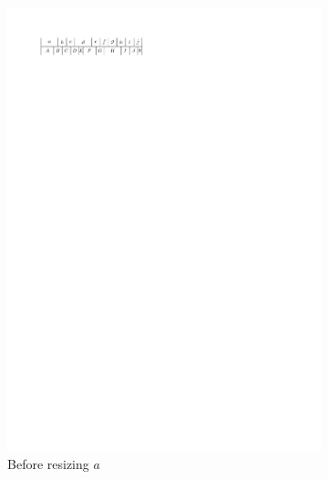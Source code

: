 \begin{figure}[b]
    \quad
    \begin{subfigure}[b]{0.45 \textwidth}
      \centering
      \includegraphics[width=\textwidth]{introduction/img/10sidedBefore.pdf}
      \caption{Before resizing $a$}
      \label{fig:intro:10sidedBefore}
    \end{subfigure}
    \hfill
    \begin{subfigure}[b]{0.45 \textwidth}
      \centering

\end{subfigure}
\end{figure}
